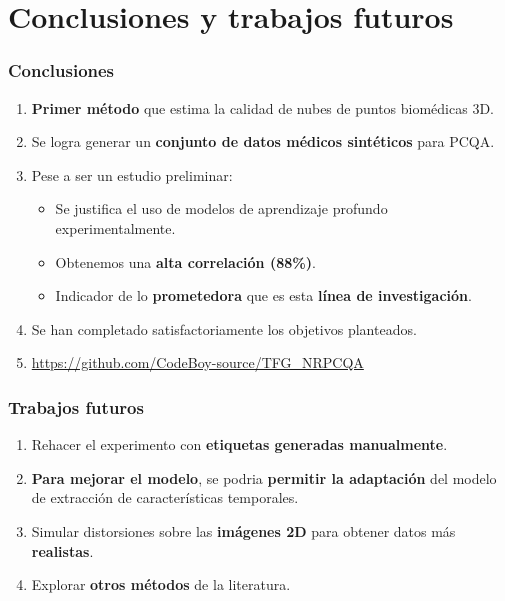 \section{Conclusiones y trabajos futuros}
\begin{frame}
  \frametitle{Conclusiones}
  \begin{enumerate}
    \item \textbf{Primer método} que estima la calidad de nubes de puntos biomédicas 3D.
    \item Se logra generar un \textbf{conjunto de datos médicos sintéticos } para PCQA.
    \item Pese a ser un estudio preliminar: 
      \begin{itemize}
        \item Se justifica el uso de modelos de aprendizaje profundo experimentalmente.
        \item Obtenemos una \textbf{alta correlación (88\%)}. 
        \item Indicador de lo \textbf{prometedora} que es esta \textbf{línea de investigación}.
      \end{itemize}
    \item Se han completado satisfactoriamente los objetivos planteados.
    \item \url{https://github.com/CodeBoy-source/TFG_NRPCQA} 
  \end{enumerate}
\end{frame}


\begin{frame}
  \frametitle{Trabajos futuros}
  \begin{enumerate}
    \item Rehacer el experimento con \textbf{etiquetas generadas manualmente}. 
    \item \textbf{Para mejorar el modelo}, se podria \textbf{permitir la adaptación} del modelo de extracción de características temporales.
    \item Simular distorsiones sobre las \textbf{imágenes 2D} para obtener datos más \textbf{realistas}.
    \item Explorar \textbf{otros métodos} de la literatura. 
  \end{enumerate}
\end{frame}

